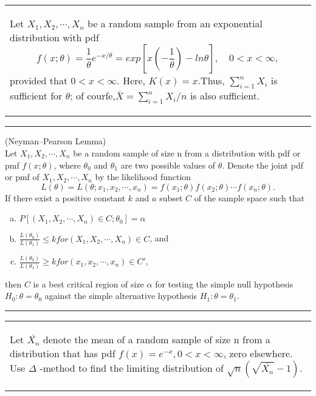 	\begin{center}
	\colorbox{bananamania}{\begin{tabular}{p{}}
		\begin{ex}\label{ex_ex}
	Let $X_1,X_2,\cdots, X_n$ be a random sample from an exponential distribution with pdf
	$$f(x;\theta)=\frac{1}{\theta}e^{-x/\theta}=exp\left[ x(-\frac{1}{\theta})-ln\theta\right], \quad 0 < x < \infty, $$
	provided that $ 0 < x < \infty$. Here, $K(x)=x$.Thus, $\sum_{i=1}^nX_i$ is sufficient for $\theta$; of courfe,$\bar{X}=\sum_{i=1}^nX_i/n$ is also sufficient.
		\end{ex}
		\end{tabular}}
	\end{center}

	\noindent \rule{\textwidth}{0.2pt}
	\begin{lemma}\label{ex_lem}
	(Neyman–Pearson Lemma)\\
	 Let $X_1,X_2,\cdots,X_n$ be a random sample of size n from a distribution with pdf or pmf $f(x;\theta)$, where $\theta_0$ and $\theta_1$ are two possible values of $\theta$. Denote the joint pdf or pmf of $X_1,X_2,\cdots,X_n$ by the likelihood function $$L(\theta)=L(\theta;x_1,x_2,\cdots,x_n)=f(x_1;\theta)f(x_2;\theta)\cdots f(x_n;\theta).$$ 
	 If there exist a positive constant $k$ and $a$ subset $C$ of the sample space such that 
	 	\begin{enumerate}[(a)]
	 	\item $P[(X_1,X_2,\cdots,X_n) \in C;\theta_0]= \alpha$
	 	\item $\frac{L(\theta_0)}{L(\theta_1)} \leq k for (X_1,X_2,\cdots,X_n)\in C$, and 
	 	\item $\frac{L(\theta_0)}{L(\theta_1)}  \geq k for (x_1,x_2,\cdots,x_n)\in C',$ 
	 	\end{enumerate}
	then $C$ is a best critical region of size $\alpha$ for testing the simple null hypothesis $H_0: \theta = \theta_0$ against the simple alternative hypothesis $H_1: \theta = \theta_1$.
	\end{lemma}
	\noindent \rule{\textwidth}{0.2pt}

		
	\begin{center}
	\colorbox{bananamania}{\begin{tabular}{p{}}
		\begin{EX}\label{ex_EX}
		Let $\bar{X_n}$ denote the mean of a random sample of size n from a distribution that has pdf $f(x)=e^{-x}, 0 < x < \infty$, zero elsewhere.
		Use $\Delta$ -method to find the limiting distribution of $\sqrt{n}(\sqrt{\bar{X_n}}-1)$.
		\end{EX}
		\end{tabular}}
	\end{center}


